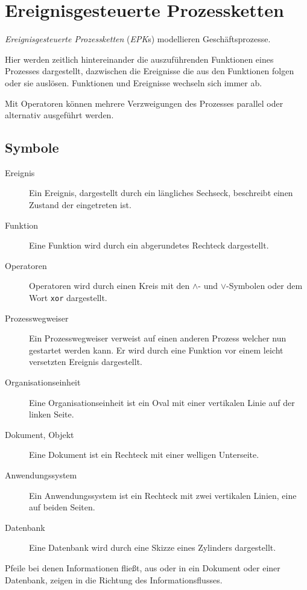 \documentclass{article}
\begin{document}
\section{Ereignisgesteuerte Prozessketten} 
\emph{Ereignisgesteuerte Prozessketten} (\emph{EPK}s) modellieren Geschäftsprozesse.

Hier werden zeitlich hintereinander die auszuführenden Funktionen eines Prozesses dargestellt, dazwischen die Ereignisse die aus den Funktionen folgen oder sie auslösen.
Funktionen und Ereignisse wechseln sich immer ab.

Mit Operatoren können mehrere Verzweigungen des Prozesses parallel oder alternativ ausgeführt werden.

\subsection{Symbole}
\begin{description}
 \item[Ereignis] Ein Ereignis, dargestellt durch ein längliches Sechseck, beschreibt einen Zustand der eingetreten ist.
 \item[Funktion] Eine Funktion wird durch ein abgerundetes Rechteck dargestellt.
 \item[Operatoren] Operatoren wird durch einen Kreis mit den $\land$- und $\lor$-Symbolen oder dem Wort \texttt{xor} dargestellt.
 \item[Prozesswegweiser] Ein Prozesswegweiser verweist auf einen anderen Prozess welcher nun gestartet werden kann. Er wird durch eine Funktion vor einem leicht versetzten Ereignis dargestellt.  
 \item[Organisationseinheit] Eine Organisationseinheit ist ein Oval mit einer vertikalen Linie auf der linken Seite.
 \item[Dokument, Objekt] Eine Dokument ist ein Rechteck mit einer welligen Unterseite.
 \item[Anwendungssystem] Ein Anwendungssystem ist ein Rechteck mit zwei vertikalen Linien, eine auf beiden Seiten.
 \item[Datenbank] Eine Datenbank wird durch eine Skizze eines Zylinders dargestellt.
\end{description}
Pfeile bei denen Informationen fließt, \zb aus oder in ein Dokument oder einer Datenbank, zeigen in die Richtung des Informationsflusses.
\end{document}
